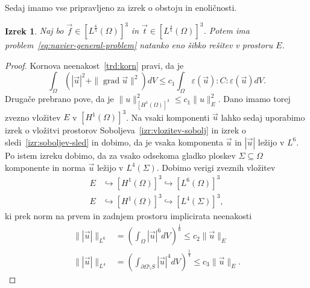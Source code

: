 \documentclass[12pt,a4paper,twoside]{article}
\theoremstyle{definition} %
\theoremstyle{plain} %
\newtheorem{izrek}[definicija]{Izrek}
\numberwithin{equation}{section}
\newcommand{\grad}{\operatorname{grad}}
\newcommand{\eps}{\varepsilon}
\newcommand{\vt}{\vec{t}}
\newcommand{\vu}{\vec{u}}
\newcommand{\vf}{\vec{f}}
\begin{document}
Sedaj imamo vse pripravljeno za izrek o obstoju in enoličnosti.
\begin{izrek}
  \label{iz:enol-obst}
  Naj bo $\vf \in [L^\frac65(\Omega)]^3$ in $\vt \in [L^{\frac45}(\Omega)]^3$.
  Potem ima problem~\ref{eq:navier-general-problem} natanko eno šibko rešitev v
  prostoru $E$.
\end{izrek}
\begin{proof}
Kornova neenakost~\ref{trd:korn} pravi, da je
\[
  \int_{\Omega} (|\vu|^2 + \|\grad \vu\|^2) dV \leq c_1 \int_{\Omega}
  \eps(\vu):C:\eps(\vu)dV.
\]
Drugače prebrano pove, da je $\|u\|_{[H^1(\Omega)]^3}^2 \leq c_1 \|u\|_E^2$.
Dano imamo torej zvezno vložitev $E$ v $[H^1(\Omega)]^3$.
Na vsaki komponenti $\vu$ lahko sedaj uporabimo izrek o vložitvi prostorov
Soboljeva~\ref{izr:vlozitev-sobolj} in izrek o sledi~\ref{izr:soboljev-sled} in dobimo, da je vsaka
komponenta $\vu$ in $|\vu|$ ležijo v $L^6$. Po istem izreku dobimo, da za vsako odsekoma gladko
ploskev $\Sigma \subseteq \Omega$ komponente in norma $\vu$ ležijo v
$L^4(\Sigma)$. Dobimo verigi zveznih vložitev
\begin{align*}
  E &\hookrightarrow [H^1(\Omega)]^3 \hookrightarrow [L^6(\Omega)]^3 \\
  E &\hookrightarrow [H^1(\Omega)]^3 \hookrightarrow [L^4(\Sigma)]^3,
\end{align*}
ki prek norm na prvem in zadnjem prostoru implicirata neenakosti
\begin{align*}
  \||\vu|\|_{L^6} &= \left( \int_{\Omega} |\vu|^6 dV \right)^\frac16 \leq
  c_2 \|\vu\|_E \\
  \||\vu|\|_{L^4} &= \left( \int_{\partial\Omega\setminus S} |\vu|^4 dV \right)^\frac14 \leq
  c_3 \|\vu\|_E.
\end{align*}


\end{proof}
\end{document}
